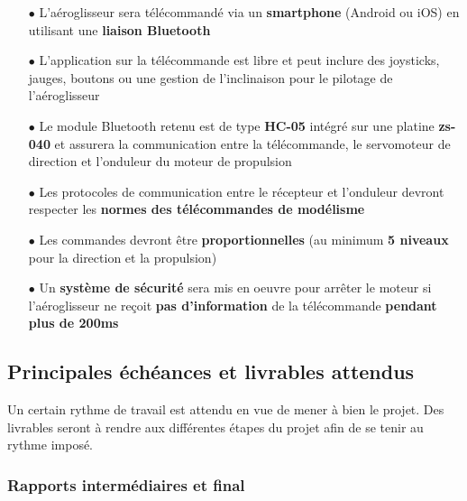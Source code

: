 \documentclass[a4paper,12pt]{report}
\begin{document}
			\begin{itemize}
				\item[$\bullet$] L'aéroglisseur sera télécommandé via un \textbf{smartphone} (Android ou iOS) en utilisant une \textbf{liaison Bluetooth}
				\item[$\bullet$] L'application sur la télécommande est libre et peut inclure des joysticks, jauges, boutons ou une gestion de l'inclinaison pour le pilotage de l'aéroglisseur
				\item[$\bullet$] Le module Bluetooth retenu est de type \textbf{HC-05} intégré sur une platine \textbf{zs-040} et assurera la communication entre la télécommande, le servomoteur de direction et l'onduleur du moteur de propulsion
				\item[$\bullet$] Les protocoles de communication entre le récepteur et l'onduleur devront respecter les \textbf{normes des télécommandes de modélisme}
				\item[$\bullet$] Les commandes devront être \textbf{proportionnelles} (au minimum \textbf{5 niveaux} pour la direction et la propulsion)
				\item[$\bullet$] Un \textbf{système de sécurité} sera mis en oeuvre pour arrêter le moteur si l'aéroglisseur ne reçoit \textbf{pas d'information} de la télécommande \textbf{pendant plus de 200ms}
			\end{itemize}
			
			\vspace{-1em}
		
		\subsection{Principales échéances et livrables attendus}
		
		\vspace{-1em}
		
		Un certain rythme de travail est attendu en vue de mener à bien le projet. Des livrables seront à rendre aux différentes étapes du projet afin de se tenir au rythme imposé.
		
			\vspace{-1em}
		
			\subsubsection{Rapports intermédiaires et final}
			
\end{document}
